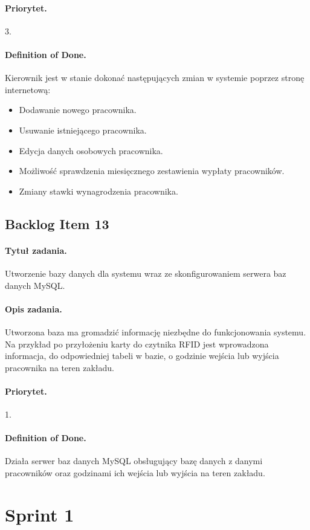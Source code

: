 \documentclass[a4paper]{article}
\begin{document}
\paragraph{Priorytet.} 3.
\paragraph{Definition of Done.} Kierownik jest w stanie dokonać następujących zmian w systemie poprzez stronę internetową:
\begin{itemize}
\item Dodawanie nowego pracownika.
\item Usuwanie istniejącego pracownika.
\item Edycja danych osobowych pracownika.
\item Możliwość sprawdzenia miesięcznego zestawienia wypłaty pracowników.
\item Zmiany stawki wynagrodzenia pracownika.
\end {itemize}

\subsection{Backlog Item 13}
\paragraph{Tytuł zadania.} Utworzenie bazy danych dla systemu wraz ze skonfigurowaniem serwera baz danych MySQL.
\paragraph{Opis zadania.} Utworzona baza ma gromadzić informację niezbędne do funkcjonowania systemu. Na przykład po przyłożeniu karty do czytnika RFID jest wprowadzona informacja, do odpowiedniej tabeli w bazie, o godzinie wejścia lub wyjścia pracownika na teren zakładu. 
\paragraph{Priorytet.} 1.
\paragraph{Definition of Done.} Działa serwer baz danych MySQL obsługujący bazę danych z danymi pracowników oraz godzinami ich wejścia lub wyjścia na teren zakładu. 

\section{Sprint 1}
\end{document}
